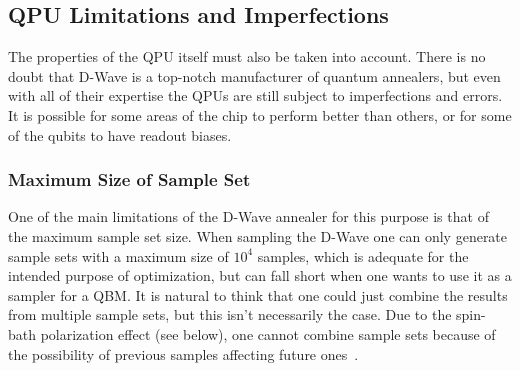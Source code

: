\subsection{QPU Limitations and Imperfections}
The properties of the QPU itself must also be taken into account.
There is no doubt that D-Wave is a top-notch manufacturer of quantum annealers, but even with all of their expertise the QPUs are still subject to imperfections and errors.
It is possible for some areas of the chip to perform better than others, or for some of the qubits to have readout biases.

\subsubsection{Maximum Size of Sample Set}
One of the main limitations of the D-Wave annealer for this purpose is that of the maximum sample set size.
When sampling the D-Wave one can only generate sample sets with a maximum size of \( 10^4 \) samples, which is adequate for the intended purpose of optimization, but can fall short when one wants to use it as a sampler for a QBM.
It is natural to think that one could just combine the results from multiple sample sets, but this isn't necessarily the case.
Due to the spin-bath polarization effect (see below), one cannot combine sample sets because of the possibility of previous samples affecting future ones~\cite{pochart_2021}.


